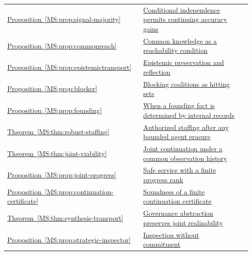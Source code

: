 \documentclass[11pt,oneside,openany]{book}
\numberwithin{equation}{section}
\begin{document}
\begin{longtable}{@{}P{.19\linewidth}P{.69\linewidth}r@{}}
\hyperref[MS:prop:signal-majority]{Proposition~\ref*{MS:prop:signal-majority}} & \hyperref[MS:prop:signal-majority]{Conditional independence permits continuing accuracy gains} & \pageref{MS:prop:signal-majority}\\
\hyperref[MS:prop:commonreach]{Proposition~\ref*{MS:prop:commonreach}} & \hyperref[MS:prop:commonreach]{Common knowledge as a reachability condition} & \pageref{MS:prop:commonreach}\\
\hyperref[MS:prop:epistemictransport]{Proposition~\ref*{MS:prop:epistemictransport}} & \hyperref[MS:prop:epistemictransport]{Epistemic preservation and reflection} & \pageref{MS:prop:epistemictransport}\\
\hyperref[MS:prop:blocker]{Proposition~\ref*{MS:prop:blocker}} & \hyperref[MS:prop:blocker]{Blocking coalitions as hitting sets} & \pageref{MS:prop:blocker}\\
\hyperref[MS:prop:founding]{Proposition~\ref*{MS:prop:founding}} & \hyperref[MS:prop:founding]{When a founding fact is determined by internal records} & \pageref{MS:prop:founding}\\
\hyperref[MS:thm:robust-staffing]{Theorem~\ref*{MS:thm:robust-staffing}} & \hyperref[MS:thm:robust-staffing]{Authorized staffing after any bounded agent erasure} & \pageref{MS:thm:robust-staffing}\\
\hyperref[MS:thm:joint-viability]{Theorem~\ref*{MS:thm:joint-viability}} & \hyperref[MS:thm:joint-viability]{Joint continuation under a common observation history} & \pageref{MS:thm:joint-viability}\\
\hyperref[MS:prop:joint-progress]{Proposition~\ref*{MS:prop:joint-progress}} & \hyperref[MS:prop:joint-progress]{Safe service with a finite progress rank} & \pageref{MS:prop:joint-progress}\\
\hyperref[MS:prop:continuation-certificate]{Proposition~\ref*{MS:prop:continuation-certificate}} & \hyperref[MS:prop:continuation-certificate]{Soundness of a finite continuation certificate} & \pageref{MS:prop:continuation-certificate}\\
\hyperref[MS:thm:synthesis-transport]{Theorem~\ref*{MS:thm:synthesis-transport}} & \hyperref[MS:thm:synthesis-transport]{Governance abstraction preserves joint realizability} & \pageref{MS:thm:synthesis-transport}\\
\hyperref[MS:prop:strategic-inspector]{Proposition~\ref*{MS:prop:strategic-inspector}} & \hyperref[MS:prop:strategic-inspector]{Inspection without commitment} & \pageref{MS:prop:strategic-inspector}\\

\end{longtable}
\end{document}
